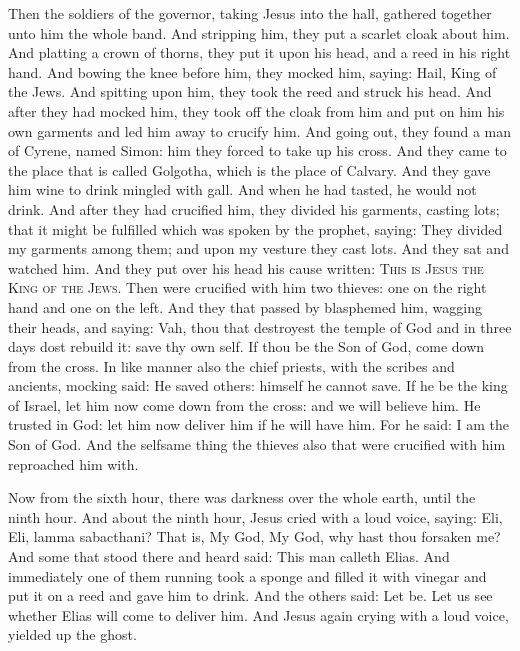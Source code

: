 \begin{multicols}{2}
Then the soldiers of the governor, taking Jesus into the hall, gathered
together unto him the whole band.  And stripping him, they put a scarlet cloak
about him.  And platting a crown of thorns, they put it upon his head, and a
reed in his right hand. And bowing the knee before him, they mocked him,
saying: Hail, King of the Jews.  And spitting upon him, they took the reed and
struck his head.  And after they had mocked him, they took off the cloak from
him and put on him his own garments and led him away to crucify him.  And going
out, they found a man of Cyrene, named Simon: him they forced to take up his
cross.  And they came to the place that is called Golgotha, which is the place
of Calvary.  And they gave him wine to drink mingled with gall. And when he had
tasted, he would not drink.  And after they had crucified him, they divided his
garments, casting lots; that it might be fulfilled which was spoken by the
prophet, saying: They divided my garments among them; and upon my vesture they
cast lots.  And they sat and watched him.  And they put over his head his cause
written: \textsc{This is Jesus the King of the Jews}.  Then were crucified with
him two thieves: one on the right hand and one on the left.  And they that
passed by blasphemed him, wagging their heads, and saying: Vah, thou that
destroyest the temple of God and in three days dost rebuild it: save thy own
self. If thou be the Son of God, come down from the cross.  In like manner also
the chief priests, with the scribes and ancients, mocking said: He saved
others: himself he cannot save. If he be the king of Israel, let him now come
down from the cross: and we will believe him.  He trusted in God: let him now
deliver him if he will have him.  For he said: I am the Son of God.  And the
selfsame thing the thieves also that were crucified with him reproached him
with.  

Now from the sixth hour, there was darkness over the whole earth, until the
ninth hour.  And about the ninth hour, Jesus cried with a loud voice, saying:
Eli, Eli, lamma sabacthani? That is, My God, My God, why hast thou forsaken me?
And some that stood there and heard said: This man calleth Elias.  And
immediately one of them running took a sponge and filled it with vinegar and
put it on a reed and gave him to drink.  And the others said: Let be. Let us
see whether Elias will come to deliver him.  And Jesus again crying with a loud
voice, yielded up the ghost.  


\end{multicols}
